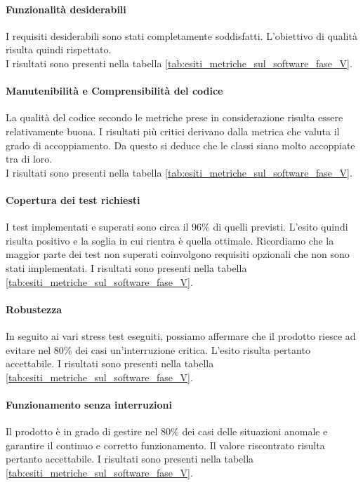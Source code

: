 \documentclass[../PianoDiQualifica.tex]{subfiles}
\begin{document}
\begin{appendices}
			\paragraph{Funzionalità desiderabili}
			I requisiti desiderabili sono stati completamente soddisfatti.
			L'obiettivo di qualità risulta quindi rispettato.\\
			I risultati sono presenti nella tabella \ref{tab:esiti_metriche_sul_software_fase_V}.
			
			\paragraph{Manutenibilità e Comprensibilità del codice}
			La qualità del codice secondo le metriche prese in considerazione risulta essere relativamente buona. I risultati più critici derivano dalla metrica che valuta il grado di accoppiamento. Da questo si deduce che le classi siano molto accoppiate tra di loro.\\
			I risultati sono presenti nella tabella \ref{tab:esiti_metriche_sul_software_fase_V}.
			
			\paragraph{Copertura dei test richiesti}
			I test implementati e superati sono circa il 96\% di quelli previsti. L'esito quindi risulta positivo e la soglia in cui rientra è quella ottimale. Ricordiamo che la maggior parte dei test non superati coinvolgono requisiti opzionali che non sono stati implementati.
			I risultati sono presenti nella tabella \ref{tab:esiti_metriche_sul_software_fase_V}.
			
			\paragraph{Robustezza}
			In seguito ai vari stress test eseguiti, possiamo affermare che il prodotto riesce ad evitare nel 80\% dei casi un'interruzione critica. L'esito risulta pertanto accettabile.
			I risultati sono presenti nella tabella \ref{tab:esiti_metriche_sul_software_fase_V}.
			
			\paragraph{Funzionamento senza interruzioni}	
			Il prodotto è in grado di gestire nel 80\% dei casi delle situazioni anomale e garantire il continuo e corretto funzionamento. Il valore riscontrato risulta pertanto accettabile.
			I risultati sono presenti nella tabella \ref{tab:esiti_metriche_sul_software_fase_V}.
			

\end{appendices}
\end{document}
